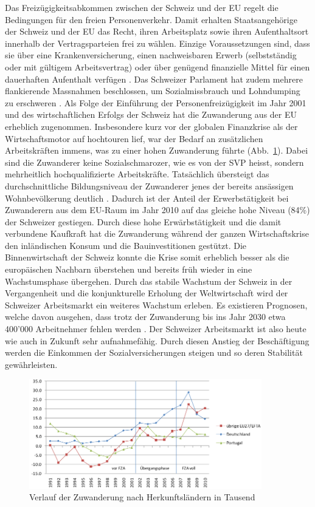 Das Freizügigkeitsabkommen zwischen der Schweiz und der EU regelt die Bedingungen für den freien
Personenverkehr. Damit erhalten Staatsangehörige der Schweiz und der EU das Recht, ihren Arbeitsplatz sowie
ihren Aufenthaltsort innerhalb der Vertragsparteien frei zu wählen. Einzige Voraussetzungen sind, dass sie über 
eine Krankenversicherung, einen nachweisbaren Erwerb (selbstständig oder mit gültigem Arbeitsvertrag) oder über 
genügend finanzielle Mittel für einen dauerhaften Aufenthalt verfügen \cite[S. 1]{ADMIN:PF}. Das Schweizer Parlament 
hat zudem mehrere flankierende Massnahmen beschlossen, um Sozialmissbrauch und Lohndumping zu erschweren \cite[S. 5-6]{ADMIN:PF}.
Als Folge der Einführung der Personenfreizügigkeit im Jahr 2001 und des wirtschaftlichen Erfolgs der Schweiz hat die 
Zuwanderung aus der EU erheblich zugenommen. Insbesondere kurz vor der globalen 
Finanzkrise als der Wirtschaftsmotor auf hochtouren lief, war der Bedarf an zusätzlichen Arbeitskräften immens, was zu einer hohen 
Zuwanderung führte (Abb.~\ref{fig:zuwanderungsaldi}). Dabei sind die Zuwanderer keine Sozialschmarozer, wie es von der SVP heisst, 
sondern mehrheitlich hochqualifizierte Arbeitskräfte. Tatsächlich übersteigt das durchschnittliche Bildungsniveau der Zuwanderer
jenes der bereits ansässigen Wohnbevölkerung deutlich \cite[S. 5-6]{ADMIN:Bericht}. Dadurch ist der Anteil der Erwerbstätigkeit bei
Zuwanderern aus dem EU-Raum im Jahr 2010 auf das gleiche hohe Niveau (84\%) der Schweizer gestiegen. Durch diese hohe Erwärbstätigkeit 
und die damit verbundene Kaufkraft hat die Zuwanderung während der ganzen Wirtschaftskrise den inländischen Konsum und die
Bauinvestitionen gestützt. Die Binnenwirtschaft der Schweiz konnte die Krise somit erheblich besser als die
europäischen Nachbarn überstehen und bereits früh wieder in eine Wachstumsphase übergehen. Durch das stabile Wachstum der Schweiz in der 
Vergangenheit und die konjunkturelle Erholung der Weltwirtschaft wird der Schweizer Arbeitsmarkt ein weiteres Wachstum erleben. Es existieren Prognosen, 
welche davon ausgehen, dass trotz der Zuwanderung bis ins Jahr 2030 etwa 400'000 Arbeitnehmer fehlen werden \cite[S. 4]{BASS:Arbeitskraeftemangel}.
Der Schweizer Arbeitsmarkt ist also heute wie auch in Zukunft sehr aufnahmefähig. Durch diesen Anstieg der Beschäftigung werden die Einkommen
der Sozialversicherungen steigen und so deren Stabilität gewährleisten.
\newpage

\begin{figure}[h]
	\begin{center}
		\includegraphics[width=0.9\textwidth]{images/Zuwanderungssaldo_Bericht_2.png}
	\end{center}
	\caption{Verlauf der Zuwanderung nach Herkunftsländern in Tausend \cite[S. 18]{ADMIN:Bericht}}
	\label{fig:zuwanderungsaldi}
\end{figure}

